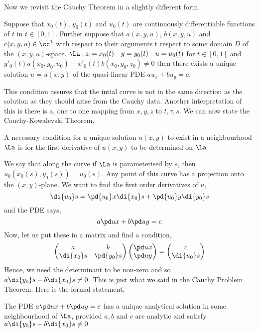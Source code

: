 Now we revisit the Cauchy Theorem in a slightly different form.
\begin{nthm}
  Suppose that $x_0(t)$, $y_0(t)$ and $u_0(t)$ are continuously differentiable functions of $t$ in $t \in [0, 1]$. Further suppose that $a(x, y, u)$, $b(x, y, u)$ and $c(x, y, u) \in \cc^1$ with respect to their arguments t respect to some domain $D$ of the $(x, y, u)$-space. $\La : x = x_0(t) \quad y = y_0(t) \quad u = u_0(t)$ for $t \in [0, 1]$ and $y'_0(t)a(x_0, y_0, u_0) - x'_0(t)b(x_0, y_0, z_0) \ne 0$ then there exists a unique solution $u = u(x, y)$ of the quasi-linear PDE $au_x + bu_y = c$.
\end{nthm}

This condition assures that the intial curve is not in the same direction as the solution as they should arise from the Cauchy data. Another interpretation of this is there is a, one to one mapping from $x, y, z$ to $t, \tau, s$. We can now state the Cauchy-Kowalevski Theorem,
\begin{nthm}
  A necessary condition for a unique solution $u(x, y)$ to exist in a neighbourhood $\La$ is for the first derivative of $u(x, y)$ to be determined on $\La$
\end{nthm}

\noindent
We say that along the curve if $\La$ is parameterised by $s$, then $u_0(x_0(s), y_0(s)) = u_0(s)$. Any point of this curve has a projection onto the $(x,y)$-plane. We want to find the first order derivatives of $u$,
$$ \di {u_0} s = \pd {u_0} x \di {x_0} s + \pd{u_0} y\di{y_0} s $$
and the PDE says,
$$ a\pd u x + b\pd u y = c $$
Now, let us put these in a matrix and find a condition,
$$ \begin{pmatrix}
  a & b \\ \di{x_0} s & \pd {y_0} s
\end{pmatrix} \begin{pmatrix}
  \pd u x \\ \pd u y
\end{pmatrix} = \begin{pmatrix}
  c \\ \di{u_0} s
\end{pmatrix}$$
Hence, we need the determinant to be non-zero and so $a\di{y_0} s - b\di{x_0} s \ne 0$. This is just what we said in the Cauchy Problem Theorem. Here is the formal statement,
\begin{nthm}[]
  The PDE $a\pd u x + b\pd u y = c$ has a unique analytical solution in some neighbourhood of $\La$, provided $a, b$ and $c$ are analytic and satisfy $a \di{y_0} s - b\di{x_0} s \ne 0$
\end{nthm}

